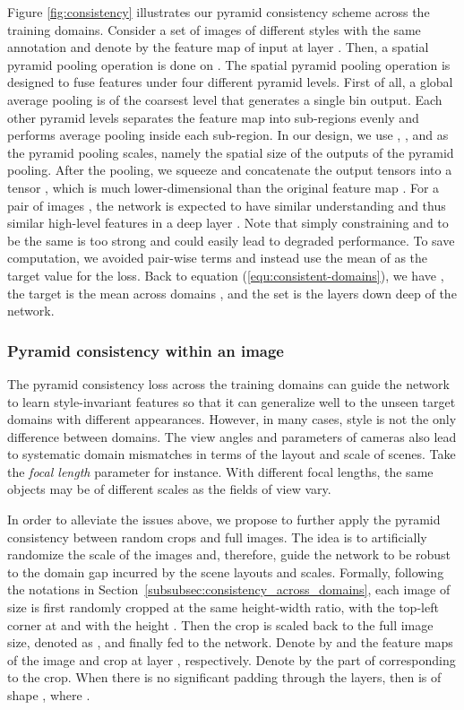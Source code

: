 \documentclass[10pt,twocolumn,letterpaper]{article}
\newcommand{\eat}[1]{}
\begin{document}
Figure \ref{fig:consistency} illustrates our pyramid consistency scheme across the training domains. Consider a set of images  of  different styles with the same annotation  and denote by   the feature map of input  at layer . Then, a spatial pyramid pooling operation is done on . The spatial pyramid pooling operation is designed to fuse features under four different pyramid levels. First of all, a global average pooling is of the coarsest level that generates a single bin output. Each other pyramid levels separates the feature map into sub-regions evenly and performs average pooling inside each sub-region. In our design, we use , ,  and  as the pyramid pooling scales, namely the spatial size of the outputs of the pyramid pooling. After the pooling, we squeeze and concatenate the output tensors into a tensor , which is much lower-dimensional than the original feature map . For a pair of images , the network is expected to have similar understanding and thus similar high-level features in a deep layer . Note that simply constraining  and  to be the same is too strong and could easily lead to degraded performance. To save computation, we avoided pair-wise terms and instead use the mean of  as the target value for the loss. Back to equation (\ref{equ:consistent-domains}), we have , the target is the mean across domains , and the set  is the layers down deep of the network. 

\eat{
get the  and  for the pyramid consistency across domains:

}


\vspace{-4mm}
\subsubsection{Pyramid consistency within an image}
\label{subsubsec:consistency_within_image}
The pyramid consistency loss across the training domains can guide the network to learn style-invariant features so that it can generalize well to the unseen target domains with different appearances. However, in many cases, style is not the only difference between domains. The view angles and parameters of cameras also lead to systematic domain mismatches in terms of the layout and scale of scenes. Take the \textit{focal length} parameter for instance. With different focal lengths, the same objects may be of different scales as the fields of view vary. 

In order to alleviate the issues above, we propose to further apply the pyramid consistency between random crops  and  full images. The idea is to artificially randomize the scale of the images and, therefore, guide the network to be robust to the domain gap incurred by the scene layouts and scales. Formally, following the notations in Section~\ref{subsubsec:consistency_across_domains}, each image  of size  is first randomly cropped at the same height-width ratio, with the top-left corner at  and with the height . Then the crop is scaled back to the full image size, denoted as , and finally fed to the network. Denote by  and  the feature maps of the image  and crop  at layer , respectively. Denote by  the part of  corresponding to the crop. When there is no significant padding through the layers, then  is of shape , where . 
\end{document}
